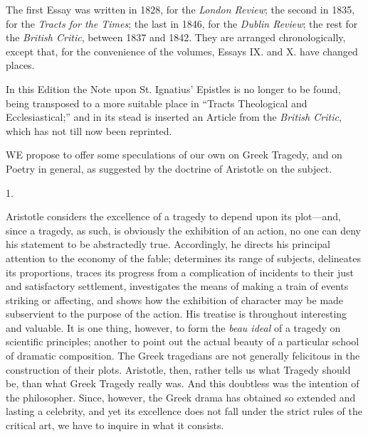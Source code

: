 The first Essay was written in 1828, for the \emph{London Review};
the second in 1835, for the \emph{Tracts for the Times}; the last in
1846, for the \emph{Dublin Review}; the rest for the \emph{British Critic},
between 1837 and 1842. They are arranged chronologically, except that,
for the convenience of the volumes, Essays IX. and X. have changed
places.


In this Edition the Note upon St. Ignatius' Epistles is no longer
to be found, being transposed to a more suitable place in ``Tracts
Theological and Ecclesiastical;'' and in its stead is inserted an
Article from the \emph{British Critic}, which has not till now been
reprinted.


WE propose to offer some speculations of
our own on Greek Tragedy, and on Poetry in general, as suggested by
the doctrine of Aristotle on the subject.

1.

Aristotle considers the excellence of a tragedy to depend upon its
plot—and, since a tragedy, as such, is obviously the exhibition of
an action, no one can deny his statement to be abstractedly true.
Accordingly, he directs his principal attention to the economy of the
fable; determines its range of subjects, delineates its proportions,
traces its progress from a complication of incidents to their just and
satisfactory settlement, investigates the means of making a train of
events striking or affecting, and shows how the exhibition of
character may be made subservient to the purpose of the action. His
treatise is throughout interesting and valuable. It is one thing,
however, to form the \emph{beau ideal} of a tragedy on scientific
principles; another to point out the actual beauty of a particular
school of dramatic composition. The Greek tragedians are not generally
felicitous in the construction of their plots. Aristotle, then, rather
tells us what Tragedy should be, than what Greek Tragedy really
was. And this doubtless was the intention of the philosopher. Since,
however, the Greek drama has obtained so extended and lasting a
celebrity, and yet its excellence does not fall under the strict rules
of the critical art, we have to inquire in what it consists.

